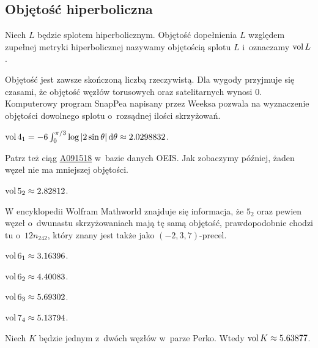 
\subsection{Objętość hiperboliczna}

\begin{definition}[objętość]
    Niech $L$ będzie splotem hiperbolicznym.
    Objętość dopełnienia $L$ względem zupełnej metryki hiperbolicznej nazywamy objętością splotu $L$ i~oznaczamy $\operatorname{vol} L$.
\end{definition}

Objętość jest zawsze skończoną liczbą rzeczywistą.
Dla wygody przyjmuje się czasami, że objętość węzłów torusowych oraz satelitarnych wynosi $0$.
Komputerowy program SnapPea napisany przez Weeksa pozwala na wyznaczenie objętości dowolnego splotu o~rozsądnej ilości skrzyżowań.

\begin{example}
    $\operatorname{vol} 4_1 = -6 \int_{0}^{\pi/3} \log |2\sin \theta| \,\mathrm{d}\theta \approx 2.0298832$.
\end{example}

Patrz też ciąg \href{https://oeis.org/A091518}{A091518} w~bazie danych OEIS.
Jak zobaczymy później, żaden węzeł nie ma mniejszej objętości.

\begin{example}
    $\operatorname{vol} 5_2 \approx 2.82812$.
\end{example}

W encyklopedii Wolfram Mathworld znajduje się informacja, że $5_2$ oraz pewien węzeł o~dwunastu skrzyżowaniach mają tę samą objętość, prawdopodobnie chodzi tu o~$12n_{242}$, który znany jest także jako $(-2, 3, 7)$-precel.

\begin{example}
    $\operatorname{vol} 6_1 \approx 3.16396$.
\end{example}

\begin{example}
    $\operatorname{vol} 6_2 \approx 4.40083$.
\end{example}

\begin{example}
    $\operatorname{vol} 6_3 \approx 5.69302$.
\end{example}

\begin{example}
    $\operatorname{vol} 7_4 \approx 5.13794$.
\end{example}

\begin{example}
    Niech $K$ będzie jednym z~dwóch węzłów w~parze Perko.
    Wtedy $\operatorname{vol} K \approx 5.63877$.
\end{example}

